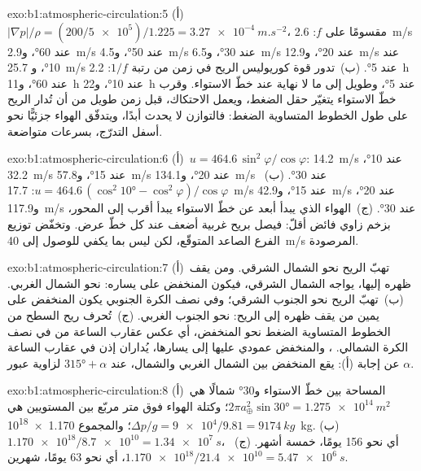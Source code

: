 \begin{solution}{exo:b1:atmospheric-circulation:5}
(أ)~$|\nabla p|/\rho = (200/\num{5e5})/1.225 = \qty{3.27e-4}{m.s^{-2}}$، مقسومًا على
$f$: \qty{2.6}{m/s} عند \ang{60}، و\qty{2.9}{m/s} عند \ang{50}، و\qty{4.5}{m/s} عند
\ang{30}، و\qty{6.5}{m/s} عند \ang{20}، و\qty{12.9}{m/s} عند \ang{10}، و
\qty{25.7}{m/s} عند \ang{5}. (ب)~تدور قوة كوريوليس الريح في زمن من رتبة
$1/f$: \qty{2.2}{h} عند \ang{60}، و\qty{11}{h} عند \ang{10}، و\qty{22}{h} عند \ang{5}، وطويل إلى ما لا نهاية عند خطّ الاستواء. وقرب خطّ الاستواء يتغيّر حقل الضغط، ويعمل الاحتكاك، قبل زمن طويل من أن تُدار الريح على طول الخطوط المتساوية الضغط: فالتوازن لا يحدث أبدًا، ويتدفّق الهواء جزئيًّا نحو أسفل التدرّج، بسرعات متواضعة.
\end{solution}

\begin{solution}{exo:b1:atmospheric-circulation:6}
(أ)~$u = 464.6\,\sin^2\varphi/\cos\varphi$: \qty{14.2}{m/s} عند \ang{10}،
\qty{32.2}{m/s} عند \ang{15}، و\qty{57.8}{m/s} عند \ang{20}، و\qty{134.1}{m/s} عند
\ang{30}. (ب)~$u = 464.6\,(\cos^2\ang{10} - \cos^2\varphi)/\cos\varphi$:
\qty{17.7}{m/s} عند \ang{15}، و\qty{42.9}{m/s} عند \ang{20}، و\qty{117.9}{m/s} عند
\ang{30}. (ج)~الهواء الذي يبدأ أبعد عن خطّ الاستواء يبدأ أقرب إلى المحور، بزخم زاوي فائض أقلّ: فيصل بريح غربية أضعف عند كل خطّ عرض. وتخفّض توزيع الفرع الصاعد  المتوقّع، لكن ليس بما يكفي للوصول إلى \qty{40}{m/s} المرصودة.
\end{solution}

\begin{solution}{exo:b1:atmospheric-circulation:7}
(أ)~تهبّ الريح نحو الشمال الشرقي. ومن يقف ظهره إليها، يواجه الشمال الشرقي، فيكون المنخفض على يساره: نحو الشمال الغربي. (ب)~تهبّ الريح نحو الجنوب الشرقي؛ وفي نصف الكرة الجنوبي يكون المنخفض على يمين من يقف ظهره إلى الريح: نحو الجنوب الغربي. (ج)~تُحرف ريح السطح من الخطوط المتساوية الضغط نحو المنخفض، أي عكس عقارب الساعة من  في نصف الكرة الشمالي. ، والمنخفض عمودي عليها إلى يسارها، يُداران إذن في عقارب الساعة عن إجابة (أ): يقع المنخفض بين الشمال الغربي والشمال، عند  $\ang{315} + \alpha$ لزاوية عبور
$\alpha$.
\end{solution}

\begin{solution}{exo:b1:atmospheric-circulation:8}
(أ)~المساحة بين خطّ الاستواء و\ang{30} شمالًا هي $2\pi a_\oplus^2\sin\ang{30} =
\qty{1.275e14}{m^2}$؛ وكتلة الهواء فوق متر مربّع بين المستويين هي
$\Delta p/g = \num{9e4}/9.81 = \qty{9174}{kg}$؛ والمجموع
\qty{1.170e18}{kg}. (ب)~$\num{1.170e18}/\num{8.7e10} = \qty{1.34e7}{s}$، أي نحو
\num{156} يومًا، خمسة أشهر. (ج)~$\num{1.170e18}/\num{21.4e10} = \qty{5.47e6}{s}$،
أي نحو \num{63} يومًا، شهرين.
\end{solution}

